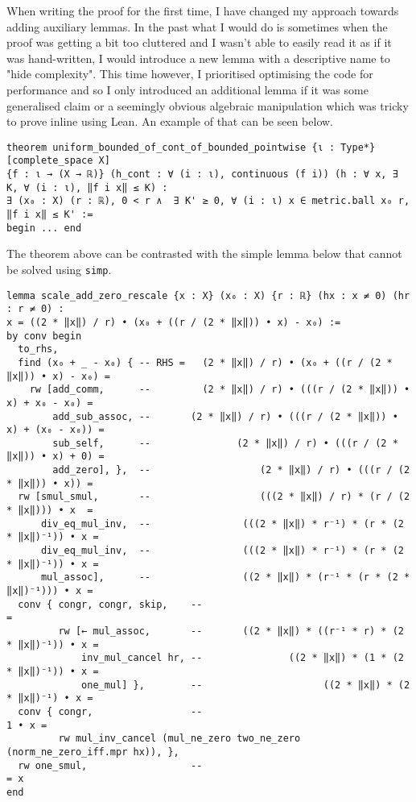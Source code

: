 \documentclass[11pt]{article}
\newenvironment{code}{\captionsetup{type=listing}}{}
\begin{document}
When writing the proof for the first time,
I have changed my approach towards adding auxiliary lemmas. In the past what I
would do is sometimes when the proof was getting a bit too cluttered and I wasn't
able to easily read it as if it was hand-written, I would introduce a new lemma
with a descriptive name to "hide complexity". This time however, I prioritised
optimising the code for performance and so I only introduced an additional lemma
if it was some generalised claim or a seemingly obvious algebraic manipulation which
was tricky to prove inline using Lean. An example of that can be seen below.
\begin{code}
\begin{verbatim}
theorem uniform_bounded_of_cont_of_bounded_pointwise {ι : Type*} [complete_space X]
{f : ι → (X → ℝ)} (h_cont : ∀ (i : ι), continuous (f i)) (h : ∀ x, ∃ K, ∀ (i : ι), ‖f i x‖ ≤ K) :
∃ (x₀ : X) (r : ℝ), 0 < r ∧  ∃ K' ≥ 0, ∀ (i : ι) x ∈ metric.ball x₀ r, ‖f i x‖ ≤ K' :=
begin ... end
\end{verbatim}
\end{code}

The theorem above can be contrasted with the simple lemma below
that cannot be solved using \texttt{simp}.
\begin{code}
\begin{verbatim}
lemma scale_add_zero_rescale {x : X} (x₀ : X) {r : ℝ} (hx : x ≠ 0) (hr : r ≠ 0) :
x = ((2 * ‖x‖) / r) • (x₀ + ((r / (2 * ‖x‖)) • x) - x₀) :=
by conv begin
  to_rhs,
  find (x₀ + _ - x₀) { -- RHS =   (2 * ‖x‖) / r) • (x₀ + ((r / (2 * ‖x‖)) • x) - x₀) =
    rw [add_comm,      --         (2 * ‖x‖) / r) • (((r / (2 * ‖x‖)) • x) + x₀ - x₀) =
        add_sub_assoc, --       (2 * ‖x‖) / r) • (((r / (2 * ‖x‖)) • x) + (x₀ - x₀)) =
        sub_self,      --               (2 * ‖x‖) / r) • (((r / (2 * ‖x‖)) • x) + 0) =
        add_zero], },  --                   (2 * ‖x‖) / r) • (((r / (2 * ‖x‖)) • x)) =
  rw [smul_smul,       --                   (((2 * ‖x‖) / r) * (r / (2 * ‖x‖))) • x  =
      div_eq_mul_inv,  --                (((2 * ‖x‖) * r⁻¹) * (r * (2 * ‖x‖)⁻¹)) • x =
      div_eq_mul_inv,  --                (((2 * ‖x‖) * r⁻¹) * (r * (2 * ‖x‖)⁻¹)) • x =
      mul_assoc],      --                ((2 * ‖x‖) * (r⁻¹ * (r * (2 * ‖x‖)⁻¹))) • x =
  conv { congr, congr, skip,    --                                                   =
         rw [← mul_assoc,       --       ((2 * ‖x‖) * ((r⁻¹ * r) * (2 * ‖x‖)⁻¹)) • x =
             inv_mul_cancel hr, --               ((2 * ‖x‖) * (1 * (2 * ‖x‖)⁻¹)) • x =
             one_mul] },        --                     ((2 * ‖x‖) * (2 * ‖x‖)⁻¹) • x =
  conv { congr,                 --                                             1 • x =
         rw mul_inv_cancel (mul_ne_zero two_ne_zero (norm_ne_zero_iff.mpr hx)), },
  rw one_smul,                  --                                                 = x
end
\end{verbatim}
\end{code}
\end{document}
